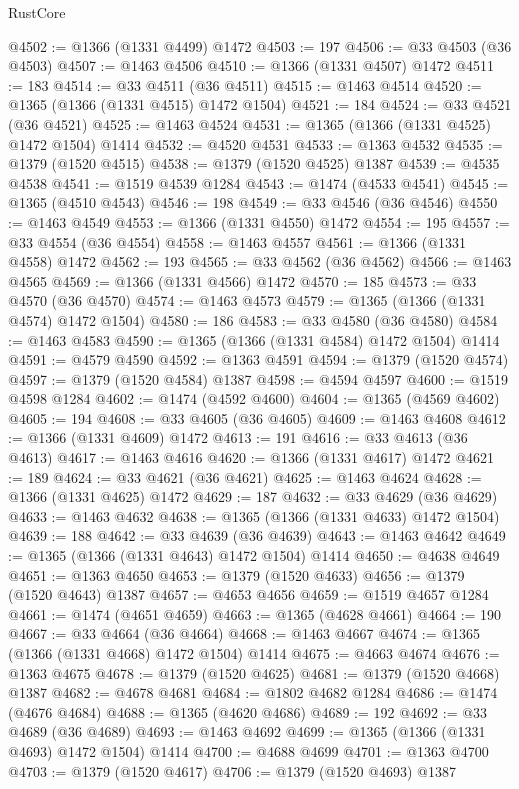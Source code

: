 \begin{lexlean}{RustCore}
\begin{coremodule}
@4502 := @1366 (@1331 @4499) @1472
@4503 := 197
@4506 := @33 @4503 (@36 @4503)
@4507 := @1463 @4506
@4510 := @1366 (@1331 @4507) @1472
@4511 := 183
@4514 := @33 @4511 (@36 @4511)
@4515 := @1463 @4514
@4520 := @1365 (@1366 (@1331 @4515) @1472 @1504)
@4521 := 184
@4524 := @33 @4521 (@36 @4521)
@4525 := @1463 @4524
@4531 := @1365 (@1366 (@1331 @4525) @1472 @1504) @1414
@4532 := @4520 @4531
@4533 := @1363 @4532
@4535 := @1379 (@1520 @4515)
@4538 := @1379 (@1520 @4525) @1387
@4539 := @4535 @4538
@4541 := @1519 @4539 @1284
@4543 := @1474 (@4533 @4541)
@4545 := @1365 (@4510 @4543)
@4546 := 198
@4549 := @33 @4546 (@36 @4546)
@4550 := @1463 @4549
@4553 := @1366 (@1331 @4550) @1472
@4554 := 195
@4557 := @33 @4554 (@36 @4554)
@4558 := @1463 @4557
@4561 := @1366 (@1331 @4558) @1472
@4562 := 193
@4565 := @33 @4562 (@36 @4562)
@4566 := @1463 @4565
@4569 := @1366 (@1331 @4566) @1472
@4570 := 185
@4573 := @33 @4570 (@36 @4570)
@4574 := @1463 @4573
@4579 := @1365 (@1366 (@1331 @4574) @1472 @1504)
@4580 := 186
@4583 := @33 @4580 (@36 @4580)
@4584 := @1463 @4583
@4590 := @1365 (@1366 (@1331 @4584) @1472 @1504) @1414
@4591 := @4579 @4590
@4592 := @1363 @4591
@4594 := @1379 (@1520 @4574)
@4597 := @1379 (@1520 @4584) @1387
@4598 := @4594 @4597
@4600 := @1519 @4598 @1284
@4602 := @1474 (@4592 @4600)
@4604 := @1365 (@4569 @4602)
@4605 := 194
@4608 := @33 @4605 (@36 @4605)
@4609 := @1463 @4608
@4612 := @1366 (@1331 @4609) @1472
@4613 := 191
@4616 := @33 @4613 (@36 @4613)
@4617 := @1463 @4616
@4620 := @1366 (@1331 @4617) @1472
@4621 := 189
@4624 := @33 @4621 (@36 @4621)
@4625 := @1463 @4624
@4628 := @1366 (@1331 @4625) @1472
@4629 := 187
@4632 := @33 @4629 (@36 @4629)
@4633 := @1463 @4632
@4638 := @1365 (@1366 (@1331 @4633) @1472 @1504)
@4639 := 188
@4642 := @33 @4639 (@36 @4639)
@4643 := @1463 @4642
@4649 := @1365 (@1366 (@1331 @4643) @1472 @1504) @1414
@4650 := @4638 @4649
@4651 := @1363 @4650
@4653 := @1379 (@1520 @4633)
@4656 := @1379 (@1520 @4643) @1387
@4657 := @4653 @4656
@4659 := @1519 @4657 @1284
@4661 := @1474 (@4651 @4659)
@4663 := @1365 (@4628 @4661)
@4664 := 190
@4667 := @33 @4664 (@36 @4664)
@4668 := @1463 @4667
@4674 := @1365 (@1366 (@1331 @4668) @1472 @1504) @1414
@4675 := @4663 @4674
@4676 := @1363 @4675
@4678 := @1379 (@1520 @4625)
@4681 := @1379 (@1520 @4668) @1387
@4682 := @4678 @4681
@4684 := @1802 @4682 @1284
@4686 := @1474 (@4676 @4684)
@4688 := @1365 (@4620 @4686)
@4689 := 192
@4692 := @33 @4689 (@36 @4689)
@4693 := @1463 @4692
@4699 := @1365 (@1366 (@1331 @4693) @1472 @1504) @1414
@4700 := @4688 @4699
@4701 := @1363 @4700
@4703 := @1379 (@1520 @4617)
@4706 := @1379 (@1520 @4693) @1387

\end{coremodule}
\end{lexlean}
